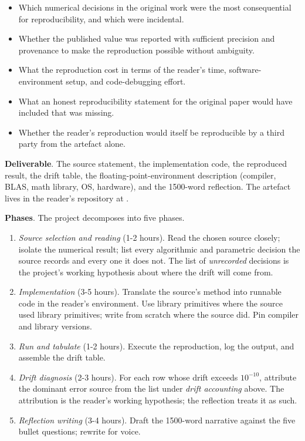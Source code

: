 \begin{project}
\begin{itemize}[leftmargin=*]
  \item Which numerical decisions in the original work were the
    most consequential for reproducibility, and which were
    incidental.
  \item Whether the published value was reported with sufficient
    precision and provenance to make the reproduction possible
    without ambiguity.
  \item What the reproduction cost in terms of the reader's
    time, software-environment setup, and code-debugging effort.
  \item What an honest reproducibility statement for the original
    paper would have included that was missing.
  \item Whether the reader's reproduction would itself be
    reproducible by a third party from the artefact alone.
\end{itemize}

\textbf{Deliverable}. The source statement, the implementation
code, the reproduced result, the drift table, the
floating-point-environment description (compiler, BLAS, math
library, OS, hardware), and the 1500-word reflection. The
artefact lives in the reader's repository at .

\textbf{Phases}. The project decomposes into five phases.

\begin{enumerate}[leftmargin=*]
  \item \emph{Source selection and reading} (1-2 hours). Read the
    chosen source closely; isolate the numerical result; list every
    algorithmic and parametric decision the source records and
    every one it does not. The list of \emph{unrecorded} decisions
    is the project's working hypothesis about where the drift will
    come from.
  \item \emph{Implementation} (3-5 hours). Translate the source's
    method into runnable code in the reader's environment. Use
    library primitives where the source used library primitives;
    write from scratch where the source did. Pin compiler and
    library versions.
  \item \emph{Run and tabulate} (1-2 hours). Execute the
    reproduction, log the output, and assemble the drift table.
  \item \emph{Drift diagnosis} (2-3 hours). For each row whose
    drift exceeds $10^{-10}$, attribute the dominant error source
    from the list under \emph{drift accounting} above. The
    attribution is the reader's working hypothesis; the reflection
    treats it as such.
  \item \emph{Reflection writing} (3-4 hours). Draft the 1500-word
    narrative against the five bullet questions; rewrite for
    voice.
\end{enumerate}


\end{project}
